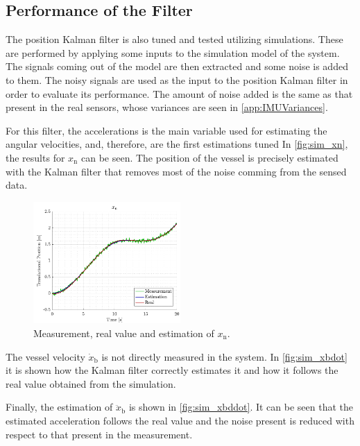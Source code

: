 \subsection{Performance of the Filter}
The position Kalman filter is also tuned and tested utilizing simulations. These are performed by applying some inputs to the simulation model of the system. The signals coming out of the model are then extracted and some noise is added to them. The noisy signals are used as the input to the position Kalman filter in order to evaluate its performance. The amount of noise added is the same as that present in the real sensors, whose variances are seen in \autoref{app:IMUVariances}.

For this filter, the accelerations is the main variable used for estimating the angular velocities, and, therefore, are the first estimations tuned  
In \autoref{fig:sim_xn}, the results for $x_\mathrm{n}$ can be seen. The position of the vessel is precisely estimated with the Kalman filter that removes most of the noise comming from the sensed data.

\begin{figure}[H]
    \includegraphics[width=0.5\textwidth]{figures/sim_xn}
    \caption{Measurement, real value and estimation of $x_\mathrm{n}$.}
    \label{fig:sim_xn}
\end{figure}

The vessel velocity $\dot{x}_\mathrm{b}$ is not directly measured in the system. In \autoref{fig:sim_xbdot} it is shown how the Kalman filter correctly estimates it and how it follows the real value obtained from the simulation.

Finally, the estimation of $\ddot{x}_\mathrm{b}$ is shown in \autoref{fig:sim_xbddot}. It can be seen that the estimated acceleration follows the real value and the noise present is reduced with respect to that present in the measurement.

